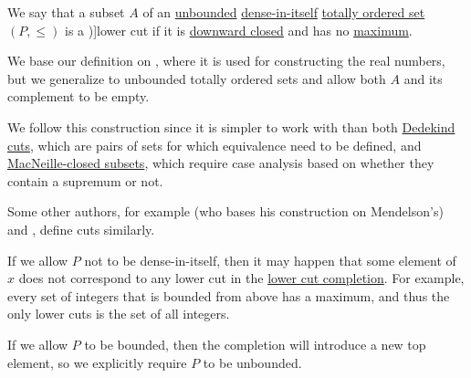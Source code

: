 \begin{definition}\label{def:lower_cut}
  We say that a subset \( A \) of an \hyperref[def:extremal_points/bounds]{unbounded} \hyperref[def:dense_total_order]{dense-in-itself} \hyperref[def:totally_ordered_set]{totally ordered set} \( (P, \leq) \) is a \term[en=lower cut (\cite[325]{Mendelson2008NumberSystems})]{lower cut} if it is \hyperref[def:closed_ordered_subset]{downward closed} and has no \hyperref[def:extremal_points/maximum_and_minimum]{maximum}.
\end{definition}
\begin{comments}
  \item We base our definition on \cite[325]{Mendelson2008NumberSystems}, where it is used for constructing the real numbers, but we generalize to unbounded totally ordered sets and allow both \( A \) and its complement to be empty.

  We follow this construction since it is simpler to work with than both \hyperref[def:dedekind_cut]{Dedekind cuts}, which are pairs of sets for which equivalence need to be defined, and \hyperref[def:macnielle_closure]{MacNeille-closed subsets}, which require case analysis based on whether they contain a supremum or not.

  Some other authors, for example  (who bases his construction on Mendelson's) and , define cuts similarly.

  \item If we allow \( P \) not to be dense-in-itself, then it may happen that some element of \( x \) does not correspond to any lower cut in the \hyperref[def:lower_cut_completion]{lower cut completion}. For example, every set of integers that is bounded from above has a maximum, and thus the only lower cuts is the set of all integers.

  \item If we allow \( P \) to be bounded, then the completion will introduce a new top element, so we explicitly require \( P \) to be unbounded.
\end{comments}

